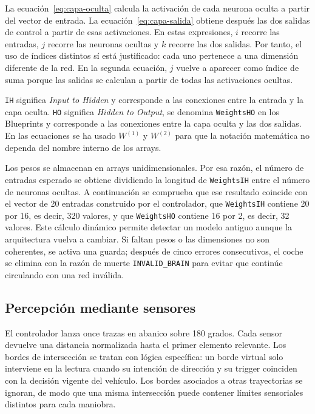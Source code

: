 La ecuación~\ref{eq:capa-oculta} calcula la activación de cada neurona oculta a partir del vector de entrada. La ecuación~\ref{eq:capa-salida} obtiene después las dos salidas de control a partir de esas activaciones. En estas expresiones, \(i\) recorre las entradas, \(j\) recorre las neuronas ocultas y \(k\) recorre las dos salidas. Por tanto, el uso de índices distintos sí está justificado: cada uno pertenece a una dimensión diferente de la red. En la segunda ecuación, \(j\) vuelve a aparecer como índice de suma porque las salidas se calculan a partir de todas las activaciones ocultas.

\texttt{IH} significa \textit{Input to Hidden} y corresponde a las conexiones entre la entrada y la capa oculta. \texttt{HO} significa \textit{Hidden to Output}, se denomina \texttt{WeightsHO} en los Blueprints y corresponde a las conexiones entre la capa oculta y las dos salidas. En las ecuaciones se ha usado \(W^{(1)}\) y \(W^{(2)}\) para que la notación matemática no dependa del nombre interno de los arrays.

Los pesos se almacenan en arrays unidimensionales. Por esa razón, el número de entradas esperado se obtiene dividiendo la longitud de \texttt{WeightsIH} entre el número de neuronas ocultas. A continuación se comprueba que ese resultado coincide con el vector de 20 entradas construido por el controlador, que \texttt{WeightsIH} contiene 20 por 16, es decir, 320 valores, y que \texttt{WeightsHO} contiene 16 por 2, es decir, 32 valores. Este cálculo dinámico permite detectar un modelo antiguo aunque la arquitectura vuelva a cambiar. Si faltan pesos o las dimensiones no son coherentes, se activa una guarda; después de cinco errores consecutivos, el coche se elimina con la razón de muerte \texttt{INVALID\_BRAIN} para evitar que continúe circulando con una red inválida.

\subsection{Percepción mediante sensores}

El controlador lanza once trazas en abanico sobre 180 grados. Cada sensor devuelve una distancia normalizada hasta el primer elemento relevante. Los bordes de intersección se tratan con lógica específica: un borde virtual solo interviene en la lectura cuando su intención de dirección y su trigger coinciden con la decisión vigente del vehículo. Los bordes asociados a otras trayectorias se ignoran, de modo que una misma intersección puede contener límites sensoriales distintos para cada maniobra.

